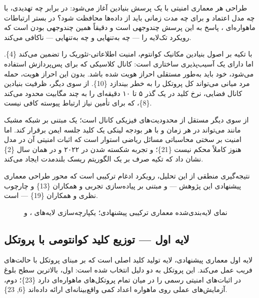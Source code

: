 \documentclass[a4paper,14pt]{extreport}
\begin{document}
طراحی هر معماری امنیتی با یک پرسش بنیادین آغاز می‌شود: در برابر چه تهدیدی، با چه مدل اعتماد  و برای چه مدت زمانی باید از داده‌ها محافظت شود؟ در بستر ارتباطات ماهواره‌ای ، پاسخ به این پرسش چندوجهی است و دقیقاً همین چندوجهی بودن است که رویکرد تک‌لایه را --- چه  به‌تنهایی و چه  به‌تنهایی --- ناکافی می‌کند.

 با تکیه بر اصول بنیادین مکانیک کوانتوم، امنیت اطلاعاتی-تئوریک را تضمین می‌کند \{4\}. اما  دارای یک آسیب‌پذیری ساختاری است: کانال کلاسیکی که برای پس‌پردازش استفاده می‌شود، خود باید به‌طور مستقلی احراز هویت شده باشد. بدون این احراز هویت، حمله مرد میانی  می‌تواند کل پروتکل را به خطر بیندازد \{10\}. از سوی دیگر، ظرفیت بنیادین کانال فضایی، نرخ کلید  در یک گذر ۵ تا ۱۰ دقیقه‌ای را به چند مگابیت محدود می‌کند \{8\}، که برای تأمین نیاز ارتباط پیوسته کافی نیست.

 از سوی دیگر مستقل از محدودیت‌های فیزیکی کانال است؛ یک  مبتنی بر شبکه مشبک مانند  می‌تواند در هر زمان و با هر بودجه لینکی یک کلید جلسه ایمن برقرار کند. اما امنیت  بر سختی محاسباتی مسائل ریاضی استوار است که اثبات امنیتی آن در مدل  هنوز کاملاً محکم نیست \{21\}؛ و تجربه شکسته شدن  در ۲۰۲۲ و  در همان سال \{2\} نشان داد که تکیه صرف بر یک الگوریتم  ریسک بلندمدت ایجاد می‌کند.

نتیجه‌گیری منطقی از این تحلیل، رویکرد ادغام ترکیبی  است که محور طراحی معماری پیشنهادی این پژوهش --- و مبتنی بر پیاده‌سازی تجربی  و همکاران \{13\} و چارچوب نظری  و همکاران \{19\} --- است.

\begin{figure}[H]
\centering
{}
\caption{نمای لایه‌بندی‌شده معماری ترکیبی پیشنهادی؛ یکپارچه‌سازی لایه‌های ،  و }
\label{fig:3-2}
\end{figure}

\subsection{لایه اول --- توزیع کلید کوانتومی با پروتکل }

لایه اول معماری پیشنهادی، لایه تولید کلید اصلی  است که بر مبنای پروتکل  با حالت‌های فریب  عمل می‌کند. این پروتکل به دو دلیل انتخاب شده است: اول، بالاترین سطح بلوغ در اثبات‌های امنیتی رسمی را در میان تمام پروتکل‌های  ماهواره‌ای دارد \{23\}؛ دوم، آزمایش‌های عملی روی ماهواره  اعداد کمی واقع‌بینانه‌ای ارائه داده‌اند \{6, 23\}.
\end{document}
